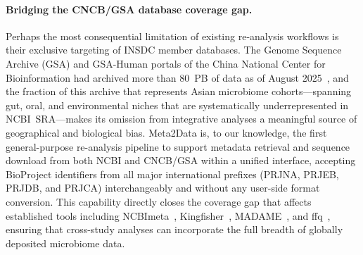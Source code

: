 \paragraph{Bridging the CNCB/GSA database coverage gap.}
Perhaps the most consequential limitation of existing re-analysis workflows is
their exclusive targeting of INSDC member databases.
The Genome Sequence Archive (GSA) and GSA-Human portals of the China National Center
for Bioinformation had archived more than 80~PB of data as of August 2025~\citep{cncb2026}, and the
fraction of this archive that represents Asian microbiome cohorts---spanning gut,
oral, and environmental niches that are systematically underrepresented in
NCBI~SRA---makes its omission from integrative analyses a meaningful source of
geographical and biological bias.
Meta2Data is, to our knowledge, the first general-purpose re-analysis pipeline to
support metadata retrieval and sequence download from both NCBI and CNCB/GSA
within a unified interface, accepting BioProject identifiers from all major
international prefixes (PRJNA, PRJEB, PRJDB, and PRJCA) interchangeably and without
any user-side format conversion.
This capability directly closes the coverage gap that affects established tools
including NCBImeta~\citep{eaton2020ncbimeta}, Kingfisher~\citep{woodcroft2024kingfisher},
MADAME~\citep{fumagalli2023madame}, and ffq~\citep{galvez2023ffq}, ensuring that
cross-study analyses can incorporate the full breadth of globally deposited
microbiome data.

